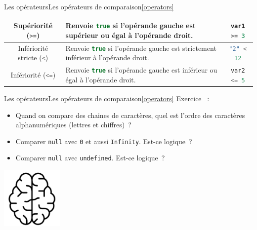 \documentclass{beamer}
\begin{document}
\begin{frame}[fragile]{Les opérateurs}{Les opérateurs de comparaison\cref{operators}}
\begin{tiny}
\begin{table}[h!]
\begin{tabular}{|c|p{4cm}|c|}
                \hline
                Supériorité (\lstinline[language=Javascript]!>=!)        & Renvoie \lstinline[language=Javascript]!true! si l'opérande gauche est supérieur ou égal à l'opérande droit.                                                                       & \lstinline[language=Javascript]!var1 >= 3!                         \\
                \hline
                Infériorité stricte (\lstinline[language=Javascript]!<!) & Renvoie \lstinline[language=Javascript]!true! si l'opérande gauche est strictement inférieur à l'opérande droit.                                                                   & \lstinline[language=Javascript]!"2" < 12!                          \\
                \hline
                Infériorité (\lstinline[language=Javascript]!<=!)        & Renvoie \lstinline[language=Javascript]!true! si l'opérande gauche est inférieur ou égal à l'opérande droit.                                                                       & \lstinline[language=Javascript]!var2 <= 5!                         \\
                \hline
            \end{tabular}
        \end{table}
    \end{tiny}
\end{frame}

\begin{frame}{Les opérateurs}{Les opérateurs de comparaison\cref{operators}}
    Exercice \execcounterdispinc{}~:
    \begin{itemize}
        \item Quand on compare des chaines de caractères, quel est l'ordre des caractères
              alphanumériques (lettres et chiffres)~?
        \item Comparer \lstinline{null} avec \lstinline{0} et aussi \lstinline{Infinity}.
              Est-ce logique~?
        \item Comparer \lstinline{null} avec \lstinline{undefined}. Est-ce logique~?
    \end{itemize}
    \bigbreak
    \centering
    \includegraphics[width=3cm]{image/intelligence}
\end{frame}
\end{document}
